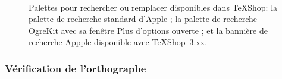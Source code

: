 \documentclass[11pt,french]{article}
\newcommand{\MacTeX}{Mac\kern-.12em\TeX}
\newcommand{\TS}{\textsf{\TeX Shop}}
\newcommand{\cmd}[1]{\textsf{#1}}
\begin{document}
\begin{figure}
\centering
{}%
\hfill%
%
\\[5pt]
\caption[Palettes de recherche/remplacement.]{Palettes pour rechercher ou remplacer disponibles dans \TS :
 la palette de recherche standard d'Apple ; %
 la palette de recherche OgreKit avec sa fenêtre \cmd{Plus d'options} ouverte ; et %
 la bannière de recherche Appple disponible avec \TS\ \cmd{3.xx}.} %
\label{FindPanels}
\end{figure}

\subsubsection{Vérification de l'orthographe}

%
\end{document}

